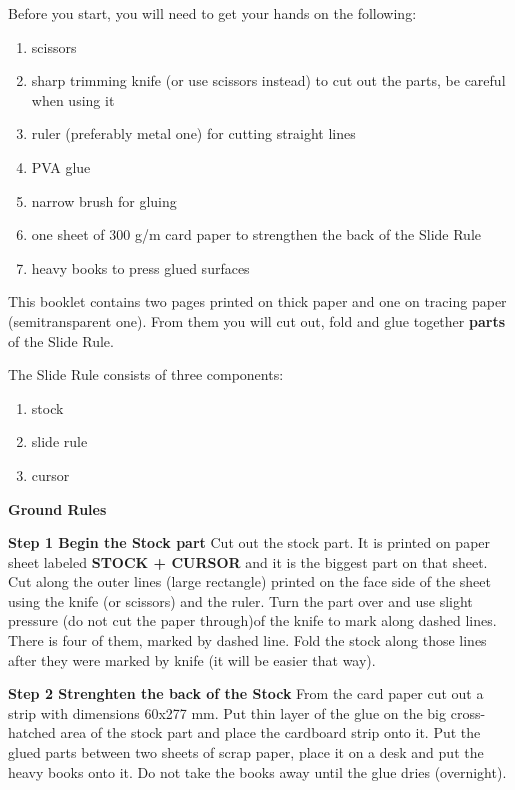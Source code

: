 \documentclass[a4paper,9pt]{article}
\begin{document}
  \begin{multicols*}{3}
  \normalsize{Before you start, you will need to get your hands on the following:
    \begin{enumerate}
      \setlength{\parskip}{0pt}
      \setlength{\parsep}{0pt}
      \item scissors
      \item sharp trimming knife (or use scissors instead) to cut out the parts, be careful when using it
      \item ruler (preferably metal one) for cutting straight lines
      \item PVA glue
      \item narrow brush for gluing
      \item one sheet of 300 g/m card paper to strengthen the back of the Slide Rule
      \item heavy books to press glued surfaces
    \end{enumerate}

  This booklet contains two pages printed on thick paper and one on tracing paper (semitransparent one). From them you will cut out, fold and glue together \textbf{parts} of the Slide Rule.

  The Slide Rule consists of three components:
    \begin{enumerate}
      \setlength{\parskip}{0pt}
      \setlength{\parsep}{0pt}
      \item stock
      \item slide rule
      \item cursor
    \end{enumerate}

  \textbf{Ground Rules} 

  \textbf{Step 1 Begin the Stock part} Cut out the stock part. It is printed on paper sheet labeled \textbf{STOCK + CURSOR} and it is the biggest part on that sheet. Cut along the outer lines (large rectangle) printed on the face side of the sheet using the knife (or scissors) and the ruler. Turn the part over and use slight pressure (do not cut the paper through)of the knife to mark along dashed lines. There is four of them, marked by dashed line. Fold the stock along those lines after they were marked by knife (it will be easier that way).

  \textbf{Step 2 Strenghten the back of the Stock} From the card paper cut out a strip with dimensions 60x277 mm. Put thin layer of the glue on the big cross-hatched area of the stock part and place the cardboard strip onto it. Put the glued parts between two sheets of scrap paper, place it on a desk and put the heavy books onto it. Do not take the books away until the glue dries (overnight).

}
\end{multicols*}
\end{document}
